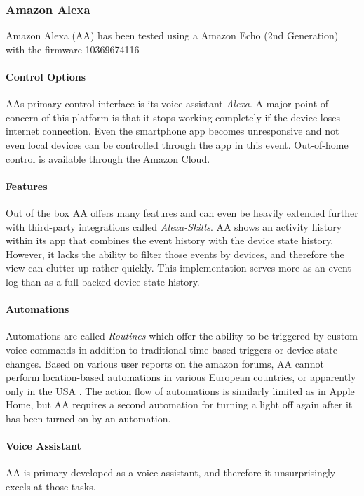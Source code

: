 \newpage
\subsubsection{Amazon Alexa}
Amazon Alexa (AA) has been tested using a Amazon Echo (2nd Generation) with the firmware 10369674116

\paragraph{Control Options}
AAs primary control interface is its voice assistant \textit{Alexa}.
A major point of concern of this platform is that it stops working completely if the device loses internet connection. Even the smartphone app becomes unresponsive and not even local devices can be controlled through the app in this event. Out-of-home control is available through the Amazon Cloud.

\paragraph{Features}
Out of the box AA offers many features and can even be heavily extended further with third-party integrations called \textit{Alexa-Skills}.
AA shows an activity history within its app that combines the event history with the device state history. However, it lacks the ability to filter those events by devices, and therefore the view can clutter up rather quickly. This implementation serves more as an event log than as a full-backed device state history.


\paragraph{Automations}
Automations are called \textit{Routines} which offer the ability to be triggered by custom voice commands in addition to traditional time based triggers or device state changes.
Based on various user reports on the amazon forums, AA cannot perform location-based automations in various European countries, or apparently only in the USA \cite{Amazon_Forum2022LocationTrigger}.
The action flow of automations is similarly limited as in Apple Home, but AA requires a second automation for turning a light off again after it has been turned on by an automation.

\paragraph{Voice Assistant}
AA is primary developed as a voice assistant, and therefore it unsurprisingly excels at those tasks.

